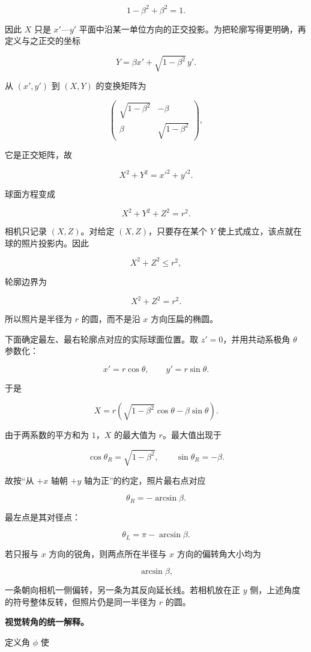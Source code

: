 \documentclass[12pt,a4paper,UTF8]{ctexart}
\begin{document}
\[1-\beta^2+\beta^2=1.\]

因此 \(X\) 只是 \(x'\)---\(y'\)
平面中沿某一单位方向的正交投影。为把轮廓写得更明确，再定义与之正交的坐标

\[Y=\beta x'+\sqrt{1-\beta^2}\,y'.\]

从 \((x',y')\) 到 \((X,Y)\) 的变换矩阵为

\[
\begin{pmatrix}
\sqrt{1-\beta^2}&-\beta\\
\beta&\sqrt{1-\beta^2}
\end{pmatrix},
\]

它是正交矩阵，故

\[X^2+Y^2=x'^2+y'^2.\]

球面方程变成

\[X^2+Y^2+Z^2=r^2.\]

相机只记录 \((X,Z)\)。对给定 \((X,Z)\)，只要存在某个 \(Y\)
使上式成立，该点就在球的照片投影内。因此

\[X^2+Z^2\le r^2,\]

轮廓边界为

\[\boxed{X^2+Z^2=r^2}.\]

所以照片是半径为 \(r\) 的圆，而不是沿 \(x\) 方向压扁的椭圆。

下面确定最左、最右轮廓点对应的实际球面位置。取 \(z'=0\)，并用共动系极角
\(\theta\) 参数化：

\[x'=r\cos\theta,\qquad y'=r\sin\theta.\]

于是

\[X=r\left(\sqrt{1-\beta^2}\cos\theta-\beta\sin\theta\right).\]

由于两系数的平方和为 \(1\)，\(X\) 的最大值为 \(r\)。最大值出现于

\[\cos\theta_R=\sqrt{1-\beta^2},\qquad \sin\theta_R=-\beta.\]

故按``从 \(+x\) 轴朝 \(+y\) 轴为正''的约定，照片最右点对应

\[\boxed{\theta_R=-\arcsin\beta}.\]

最左点是其对径点：

\[\boxed{\theta_L=\pi-\arcsin\beta}.\]

若只报与 \(x\) 方向的锐角，则两点所在半径与 \(x\) 方向的偏转角大小均为

\[\boxed{\arcsin\beta},\]

一条朝向相机一侧偏转，另一条为其反向延长线。若相机放在正 \(y\)
侧，上述角度的符号整体反转，但照片仍是同一半径为 \(r\) 的圆。

\textbf{视觉转角的统一解释。}

定义角 \(\phi\) 使
\end{document}
